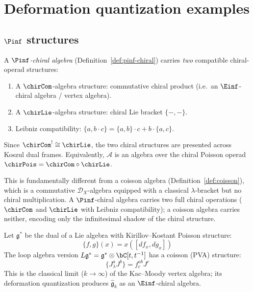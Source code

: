 
\chapter{Deformation quantization examples}
\label{chap:deformation-examples}



\section{\texorpdfstring{$\Pinf$ structures}{Pinf structures}}
\label{sec:pinf-structures}
\begin{definition}\label{def:pinf-chiral-detailed}
A \emph{$\Pinf$-chiral algebra} (Definition~\ref{def:pinf-chiral}) carries
\emph{two} compatible chiral-operad structures:
\begin{enumerate}[label=(\roman*)]
\item A $\chirCom$-algebra structure: commutative chiral product (i.e.\
  an $\Einf$-chiral algebra / vertex algebra).
\item A $\chirLie$-algebra structure: chiral Lie bracket $\{-, -\}$.
\item Leibniz compatibility: $\{a, b \cdot c\} = \{a, b\} \cdot c + b \cdot \{a, c\}$.
\end{enumerate}
Since ${\chirCom}^! \cong \chirLie$, the two chiral structures are
presented across Koszul dual frames.
Equivalently, $\mathcal{A}$ is an algebra over the chiral Poisson operad
$\chirPois = \chirCom \circ \chirLie$.

This is fundamentally different from a coisson algebra
(Definition~\ref{def:coisson}), which is a commutative
$\mathcal{D}_X$-algebra equipped with a classical $\lambda$-bracket
but no chiral multiplication.  A $\Pinf$-chiral algebra carries two
full chiral operations ($\chirCom$ and $\chirLie$ with Leibniz
compatibility); a coisson algebra carries neither, encoding only
the infinitesimal shadow of the chiral structure.
\end{definition}

\begin{example}\label{ex:classical-affine}
Let $\mathfrak{g}^*$ be the dual of a Lie algebra with Kirillov--Kostant Poisson structure:
\[
\{f, g\}(x) = x([df_x, dg_x])
\]
The loop algebra version $L\mathfrak{g}^* = \mathfrak{g}^* \otimes \bC[t, t^{-1}]$ has a
coisson (PVA) structure:
\[
\{J^a_\lambda J^b\} = f^{ab}_c J^c
\]
This is the classical limit ($k \to \infty$) of the Kac--Moody vertex algebra;
its deformation quantization produces $\hat{\mathfrak{g}}_k$ as an $\Einf$-chiral
algebra.
\end{example}


